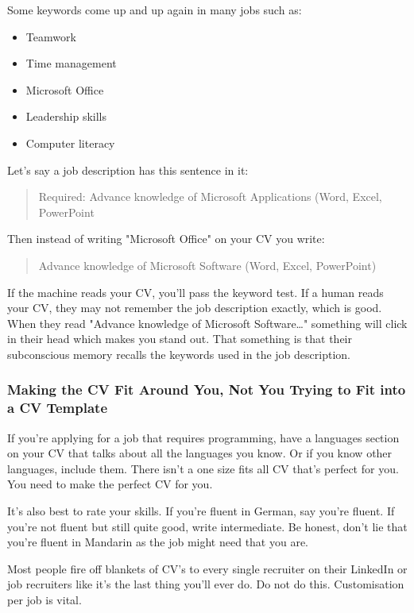 \documentclass{article}
\begin{document}
Some keywords come up and up again in many jobs such as:

\begin{itemize}
    \item Teamwork
    \item Time management
    \item Microsoft Office
    \item Leadership skills
    \item Computer literacy
\end{itemize}

Let's say a job description has this sentence in it:
\begin{quote}
    Required: Advance knowledge of Microsoft Applications (Word, Excel, PowerPoint
\end{quote}

Then instead of writing "Microsoft Office" on your CV you write:

\begin{quote}
    Advance knowledge of Microsoft Software (Word, Excel, PowerPoint)
\end{quote}

If the machine reads your CV, you'll pass the keyword test. If a human
reads your CV, they may not remember the job description exactly, which
is good. When they read "Advance knowledge of Microsoft Software\ldots"
something will click in their head which makes you stand out. That
something is that their subconscious memory recalls the keywords used in
the job description.
\subsubsection{Making the CV Fit Around You, Not You Trying to Fit into a CV Template}
If you're applying for a job that requires programming, have a
languages section on your CV that talks about all the languages you
know. Or if you know other languages, include them. There isn't a one
size fits all CV that's perfect for you. You need to make the perfect CV
for you.

It's also best to rate your skills. If you're fluent in German, say
you're fluent. If you're not fluent but still quite good, write
intermediate. Be honest, don't lie that you're fluent in Mandarin as the
job might need that you are.

Most people fire off blankets of CV's to every single recruiter on their
LinkedIn or job recruiters like it's the last thing you'll ever do. Do
not do this. Customisation per job is vital.
\end{document}
